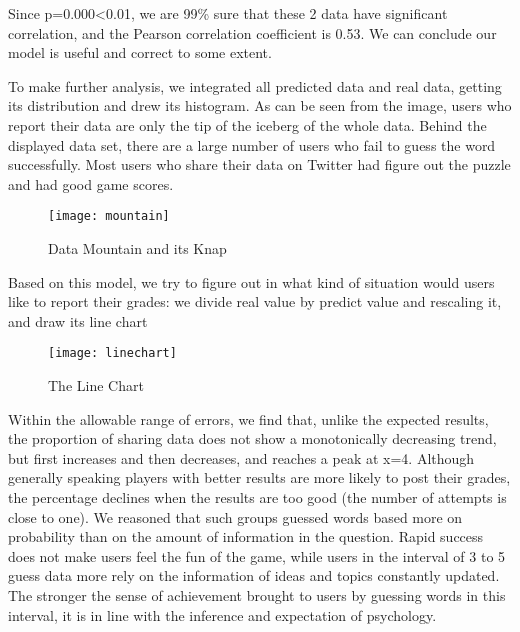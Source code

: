 \documentclass{mcmthesis}
\begin{document}
Since p=0.000<0.01, we are 99\% sure that these 2 data have significant correlation, and the Pearson correlation coefficient is 0.53. We can conclude our model is useful and correct to some extent.

To make further analysis, we integrated all predicted data and real data, getting its distribution and drew its histogram. As can be seen from the image, users who report their data are only the tip of the iceberg of the whole data. Behind the displayed data set, there are a large number of users who fail to guess the word successfully. Most users who share their data on Twitter had figure out the puzzle and had good game scores.


\begin{figure}[h]
\small
\centering
\texttt{[image: mountain]}
\caption{Data Mountain and its Knap} \label{fig:aa}
\end{figure}

Based on this model, we try to figure out in what  kind of situation would users like to report their grades: we divide real value by predict value and rescaling it, and draw its line chart

\begin{figure}[h]
\small
\centering
\texttt{[image: linechart]}
\caption{The Line Chart} \label{fig:aa}
\end{figure}

Within the allowable range of errors, we find that, unlike the expected results, the proportion of sharing data does not show a monotonically decreasing trend, but first increases and then decreases, and reaches a peak at x=4. Although generally speaking players with better results are more likely to post their grades, the percentage declines when the results are too good (the number of attempts is close to one). We reasoned that such groups guessed words based more on probability than on the amount of information in the question. Rapid success does not make users feel the fun of the game, while users in the interval of 3 to 5 guess data more rely on the information of ideas and topics constantly updated. The stronger the sense of achievement brought to users by guessing words in this interval, it is in line with the inference and expectation of psychology.
\end{document}
